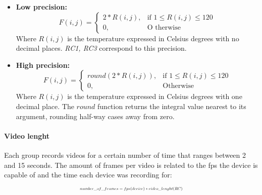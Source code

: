 \documentclass[oneside, twocolumn]{article}
\begin{document}
	\begin{itemize}
		\item \textbf{Low precision:}
			\[
			    F(i,j)=
			\begin{cases}
			    2 * R(i,j),		& \text{if } 1 \leq R(i,j) \leq 120\\
			    0,              & \text{O therwise}
			\end{cases}
			\]
			Where $R(i,j)$ is the temperature expressed in Celsius degrees with no decimal places. \textit{RC1, RC3} correspond to this precision.\\


		\item \textbf{High precision:}
			\[
			    F(i,j)=
			\begin{cases}
			    round(2 * R(i,j)),		& \text{if } 1 \leq R(i,j) \leq 120\\
			    0,              & \text{Otherwise}
			\end{cases}
			\]
			Where $R(i,j)$ is the temperature expressed in Celsius degrees with one decimal place. The $round$ function returns the integral value nearest to its argument, rounding half-way cases away from zero.
	\end{itemize}

\paragraph{Video lenght}
Each group records videos for a certain number of time that ranges between 2 and 15 seconds. The amount of frames per video is related to the fps the device is capable of and the time each device was recording for:
	\begin{equation}
	\resizebox{.423 \textwidth}{!}{$number\_of\_frames = fps(device) * video\_lenght(RC)$}
	\end{equation}
\end{document}
